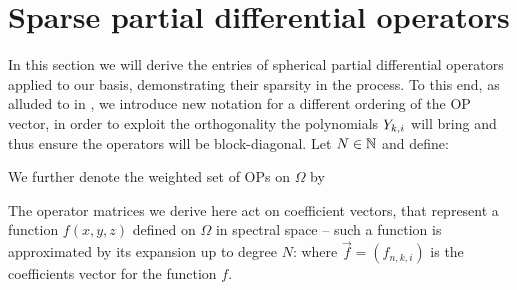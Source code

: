 %
\section{Sparse partial differential operators}\label{Section:sc:PDOs}

In this section we will derive the entries of spherical partial differential operators applied to our basis, demonstrating their sparsity in the process. To this end, as alluded to in , we introduce new notation for a different ordering of the OP vector, in order to exploit the orthogonality the polynomials $Y_{k,i}$ will bring and thus ensure the operators will be block-diagonal. Let $N \in \mathbb{N}$ and define:  

We further denote the weighted set of OPs on $\Omega$ by 

The operator matrices we derive here act on coefficient vectors, that represent a function $f(x,y,z)$ defined on $\Omega$ in spectral space -- such a function is approximated by its expansion up to degree $N$: 
where $\vec f = (f_{n,k,i})$ is the coefficients vector for the function $f$.

